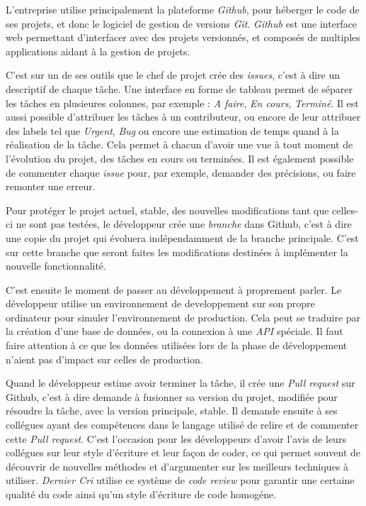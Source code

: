 L'entreprise utilise principalement la plateforme \emph{Github}, pour
héberger le code de ses projets, et donc le logiciel de gestion de
versions \emph{Git}. \emph{Github} est une interface web permettant
d'interfacer avec des projets versionnés, et composés de multiples
applications aidant à la gestion de projets.

\bigskip

C'est sur un de ses outils que le chef de projet crée des \emph{issues},
c'est à dire un descriptif de chaque tâche. Une interface en forme de
tableau permet de séparer les tâches en plusieures colonnes, par exemple
: \emph{A faire}, \emph{En cours}, \emph{Terminé}. Il est aussi possible
d'attribuer les tâches à un contributeur, ou encore de leur attribuer
des labels tel que \emph{Urgent}, \emph{Bug} ou encore une estimation de
temps quand à la réalisation de la tâche. Cela permet à chacun d'avoir
une vue à tout moment de l'évolution du projet, des tâches en cours ou
terminées. Il est également possible de commenter chaque \emph{issue}
pour, par exemple, demander des précisions, ou faire remonter une
erreur.

\bigskip

Pour protéger le projet actuel, stable, des nouvelles modifications tant
que celles-ci ne sont pas testées, le développeur crée une
\emph{branche} dans Github, c'est à dire une copie du projet qui
évoluera indépendamment de la branche principale. C'est sur cette
branche que seront faites les modifications destinées à implémenter la
nouvelle fonctionnalité.

\bigskip

C'est ensuite le moment de passer au développement à proprement parler.
Le développeur utilise un environnement de developpement sur son propre
ordinateur pour simuler l'environnement de production. Cela peut se
traduire par la création d'une base de données, ou la connexion à une
\emph{API} spéciale. Il faut faire attention à ce que les données
utilisées lors de la phase de développement n'aient pas d'impact sur
celles de production.

\bigskip

Quand le développeur estime avoir terminer la tâche, il crée une
\emph{Pull request} sur Github, c'est à dire demande à fusionner sa
version du projet, modifiée pour résoudre la tâche, avec la version
principale, stable. Il demande ensuite à ses collégues ayant des
compétences dans le langage utilisé de relire et de commenter cette
\emph{Pull request}. C'est l'occasion pour les développeurs d'avoir
l'avis de leurs collégues sur leur style d'écriture et leur façon de
coder, ce qui permet souvent de découvrir de nouvelles méthodes et
d'argumenter sur les meilleurs techniques à utiliser. \emph{Dernier Cri}
utilise ce système de \emph{code review} pour garantir une certaine
qualité du code ainsi qu'un style d'écriture de code homogéne.

